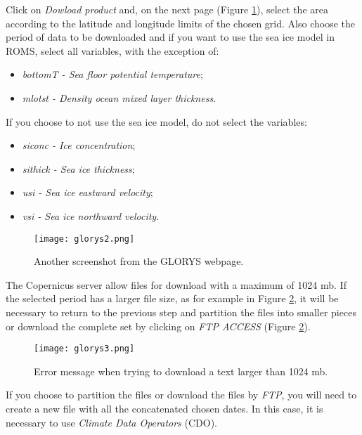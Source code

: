 \noindent Click on \textit{Dowload product} and, on the next page (Figure \textcolor{bleu_cite}{\ref{glorys2}}), select the area according to 
the latitude and longitude limits of the chosen grid. Also choose the period of data to be downloaded and if you want to use the sea 
ice model in ROMS, select all variables, with the exception of:
\bigskip

\begin{itemize}
    \item \textit{ bottomT - Sea floor potential temperature};
    \item \textit{mlotst - Density ocean mixed layer thickness}.
\end{itemize}
\bigskip

\noindent If you choose to not use the sea ice model, do not select the variables:
\bigskip

\begin{itemize}
    \item \textit{siconc - Ice concentration};
    \item \textit{sithick - Sea ice thickness};
    \item \textit{usi - Sea ice eastward velocity};
    \item \textit{vsi - Sea ice northward velocity}.
\end{itemize}
\bigskip

\begin{figure}[H]
    \centering
    \texttt{[image: glorys2.png]}
    \caption{Another screenshot from the GLORYS webpage.}
    \label{glorys2}
\end{figure}
\bigskip

\noindent The Copernicus server allow files for download with a maximum of 1024 mb. 
If the selected period has a larger file size, as for example in Figure \textcolor{bleu_cite}{\ref{glorys3}}, it will be necessary to 
return to the previous step and partition the files into smaller pieces or download the complete set by clicking on \textit{FTP ACCESS}
(Figure \textcolor{bleu_cite}{\ref{glorys3}}).
\bigskip

\begin{figure}[H]
    \centering
    \texttt{[image: glorys3.png]}
    \caption{Error message when trying to download a text larger than 1024 mb.}
    \label{glorys3}
\end{figure}
\bigskip

\noindent If you choose to partition the files or download the files by \textit{FTP}, you will need to create a new file with 
all the concatenated chosen dates. In this case, it is necessary to use \textit{Climate Data Operators} (CDO).
\bigskip


